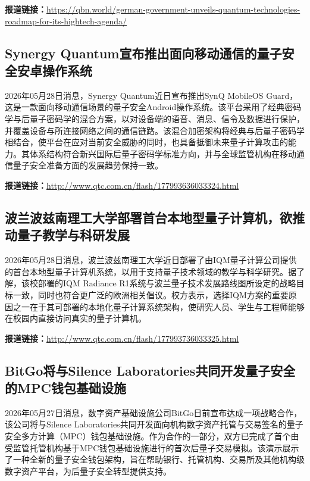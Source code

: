 \documentclass[12pt,a4paper]{ctexart}
\begin{document}
\noindent\textbf{报道链接：}\url{https://qbn.world/german-government-unveils-quantum-technologies-roadmap-for-its-hightech-agenda/}

\subsection{ Synergy Quantum宣布推出面向移动通信的量子安全安卓操作系统 }

2026年05月28日消息，Synergy Quantum近日宣布推出SynQ MobileOS Guard，这是一款面向移动通信场景的量子安全Android操作系统。该平台采用了经典密码学与后量子密码学的混合方案，以对设备端的语音、消息、信令及数据进行保护，并覆盖设备与所连接网络之间的通信链路。该混合加密架构将经典与后量子密码学相结合，使平台在应对当前安全威胁的同时，也具备抵御未来量子计算攻击的能力。其体系结构符合新兴国际后量子密码学标准方向，并与全球监管机构在移动通信量子安全准备方面的发展趋势保持一致。

\noindent\textbf{报道链接：}\url{http://www.qtc.com.cn/flash/177993636033324.html}

\subsection{ 波兰波兹南理工大学部署首台本地型量子计算机，欲推动量子教学与科研发展 }

2026年05月28日消息，波兰波兹南理工大学近日部署了由IQM量子计算公司提供的首台本地型量子计算机系统，以用于支持量子技术领域的教学与科学研究。据了解，该校部署的IQM Radiance R1系统与波兰量子技术发展路线图所设定的战略目标一致，同时也符合更广泛的欧洲相关倡议。校方表示，选择IQM方案的重要原因之一在于其可部署的本地化量子计算系统架构，使研究人员、学生与工程师能够在校园内直接访问真实的量子计算机。

\noindent\textbf{报道链接：}\url{http://www.qtc.com.cn/flash/177993736033325.html}

\subsection{ BitGo将与Silence Laboratories共同开发量子安全的MPC钱包基础设施 }

2026年05月27日消息，数字资产基础设施公司BitGo日前宣布达成一项战略合作，该公司将与Silence Laboratories共同开发面向机构数字资产托管与交易签名的量子安全多方计算（MPC）钱包基础设施。作为合作的一部分，双方已完成了首个由受监管托管机构基于MPC钱包基础设施进行的首次后量子交易模拟。该演示展示了一种全新的量子安全钱包架构，旨在帮助银行、托管机构、交易所及其他机构级数字资产平台，为后量子安全转型提供支持。
\end{document}
